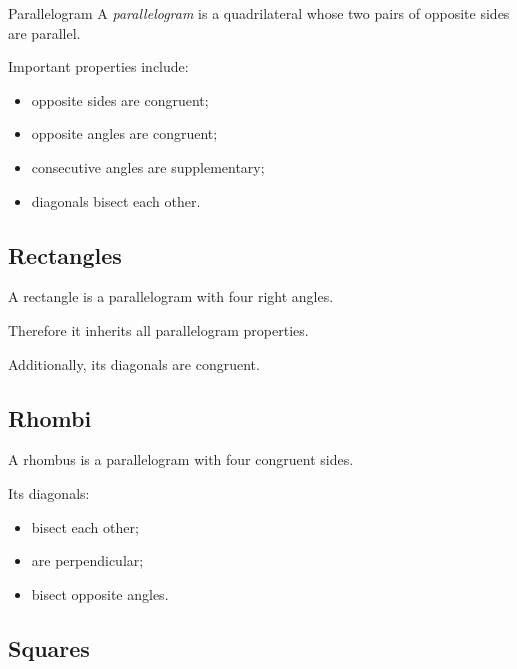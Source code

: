 \begin{definitionbox}{Parallelogram}
A \emph{parallelogram} is a quadrilateral whose two pairs of opposite sides
are parallel.
\end{definitionbox}

Important properties include:

\begin{itemize}
    \item opposite sides are congruent;
    \item opposite angles are congruent;
    \item consecutive angles are supplementary;
    \item diagonals bisect each other.
\end{itemize}

\subsection{Rectangles}
\label{subsec:rectangles}

A rectangle is a parallelogram with four right angles.

Therefore it inherits all parallelogram properties.

Additionally, its diagonals are congruent.

\subsection{Rhombi}
\label{subsec:rhombi}

A rhombus is a parallelogram with four congruent sides.

Its diagonals:

\begin{itemize}
    \item bisect each other;
    \item are perpendicular;
    \item bisect opposite angles.
\end{itemize}

\subsection{Squares}
\label{subsec:squares-euclidean}

